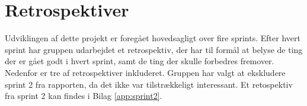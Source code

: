 \section{Retrospektiver}\label{sec:brugafscrum}
Udviklingen af dette projekt er foregået hovedsagligt over fire sprints. Efter hvert sprint har gruppen udarbejdet
et retrospektiv, der har til formål at belyse de ting der er gået godt i hvert sprint, samt de ting der skulle forbedres fremover.
Nedenfor er tre af retrospektiver inkluderet. Gruppen har valgt at ekskludere sprint 2 fra rapporten, da det ikke var tilstrækkeligt interessant.
Et retospektiv fra sprint 2 kan findes i Bilag \ref{app:sprint2}.





